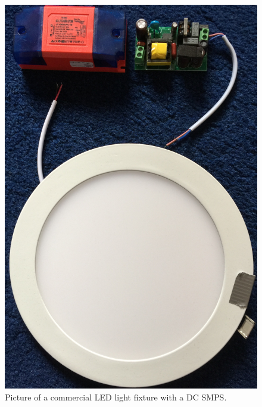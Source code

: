 	\begin{figure}
		\centering
		\begin{minipage}[b]{0.45\textwidth}
			\includegraphics[width=\textwidth]{chapters/hardware-chapters/AC/ac-modulator/smps-led/smps-led-and-smps-picture.jpg}
			\caption{Picture of a commercial LED light fixture with a DC SMPS.}
			\label{fig:ac-smps-led-and-smps-picture}
		\end{minipage}
		\hfill
		\begin{minipage}[b]{0.45\textwidth}
			\centering

\end{minipage}
\end{figure}
